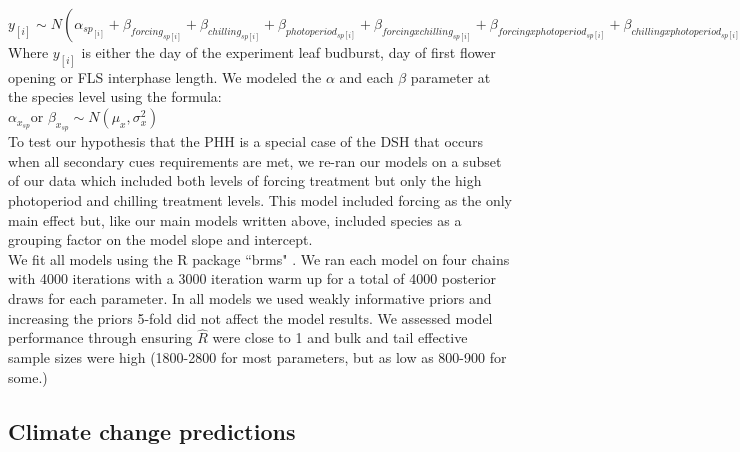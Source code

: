 \documentclass[11pt]{article}\usepackage[]{graphicx}\usepackage[]{color}
\begin{document}
$y_{[i]} \sim N(\alpha_{sp_{[i]}}+\beta_{forcing_{sp[i]}}+\beta_{chilling_{sp[i]}}+\beta_{photoperiod_{sp[i]}}+\beta_{forcing x chilling_{sp[i]}}+\beta_{forcing x photoperiod_{sp[i]}}+\beta_{chilling x photoperiod_{sp[i]}})$\\

Where $y_{[i]}$ is either the day of the experiment leaf budburst, day of first flower opening or FLS interphase length.  We modeled the $\alpha$ and each $\beta$ parameter at the species level using the formula:\\

$\alpha_{x_{sp}} $or $\beta_{x_{sp}} \sim N(\mu_x,\sigma^2_x)$\\


\noindent To test our hypothesis that the PHH is a special case of the DSH that occurs when all secondary cues requirements are met, we re-ran our models on a subset of our data which included both levels of forcing treatment but only the high photoperiod and chilling treatment levels. This model included forcing as the only main effect but, like our main models written above, included species as a grouping factor on the model slope and intercept.\\ 

\noindent We fit all models using the R package ``brms" \citep{Burkner2018}. We ran each model on four chains with 4000 iterations with a 3000 iteration warm up for a total of 4000 posterior draws for each parameter. In all models we used weakly informative priors and increasing the priors 5-fold did not affect the model results. We assessed  model performance through ensuring $\hat{R}$ were close to 1 and bulk and tail effective sample sizes were high (1800-2800 for most parameters, but as low as  800-900 for some.)\\

\subsection*{Climate change predictions}
\end{document}

